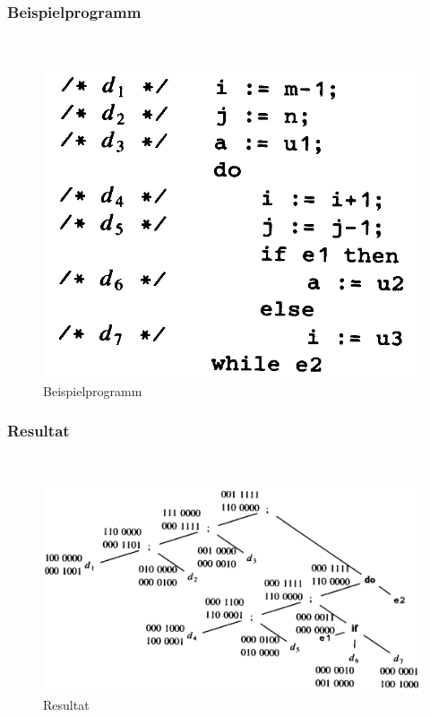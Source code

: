 \subsubsection{Beispielprogramm} %
\label{ssub:beispielprogramm}
~\\
\begin{figure}[!ht]
    \centering
    \includegraphics[scale=0.2]{images/bild3-1.png}
    \caption{Beispielprogramm}
\end{figure}

\newpage

\subsubsection{Resultat} %
\label{ssub:resultat}
~\\
\begin{figure}[!ht]
    \centering
    \includegraphics[scale=0.2]{images/bild2-1.png}
    \caption{Resultat}
\end{figure}

